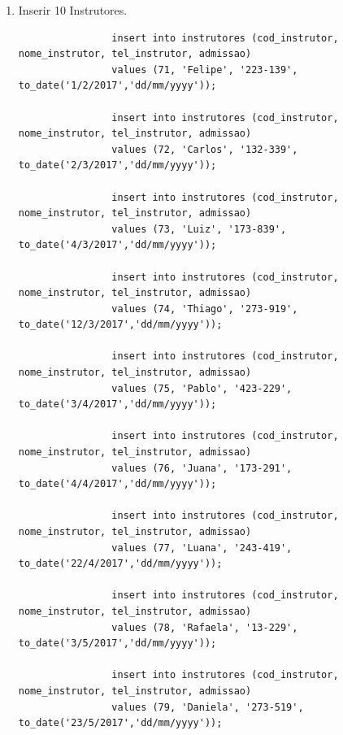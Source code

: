 \documentclass[
article,			%
11pt,				%
oneside,			%
a4paper,			%
english,			%
brazil,				%
sumario=tradicional
]{abntex2}
\begin{document}
	
	\frenchspacing 
	
	
	\maketitle
	\begin{enumerate}
		\item Inserir 10 Instrutores.
				\begin{verbatim}
				insert into instrutores (cod_instrutor, nome_instrutor, tel_instrutor, admissao) 
				values (71, 'Felipe', '223-139', to_date('1/2/2017','dd/mm/yyyy'));
				
				insert into instrutores (cod_instrutor, nome_instrutor, tel_instrutor, admissao) 
				values (72, 'Carlos', '132-339', to_date('2/3/2017','dd/mm/yyyy'));
				
				insert into instrutores (cod_instrutor, nome_instrutor, tel_instrutor, admissao) 
				values (73, 'Luiz', '173-839', to_date('4/3/2017','dd/mm/yyyy'));
				
				insert into instrutores (cod_instrutor, nome_instrutor, tel_instrutor, admissao) 
				values (74, 'Thiago', '273-919', to_date('12/3/2017','dd/mm/yyyy'));
				
				insert into instrutores (cod_instrutor, nome_instrutor, tel_instrutor, admissao) 
				values (75, 'Pablo', '423-229', to_date('3/4/2017','dd/mm/yyyy'));
				
				insert into instrutores (cod_instrutor, nome_instrutor, tel_instrutor, admissao) 
				values (76, 'Juana', '173-291', to_date('4/4/2017','dd/mm/yyyy'));
				
				insert into instrutores (cod_instrutor, nome_instrutor, tel_instrutor, admissao) 
				values (77, 'Luana', '243-419', to_date('22/4/2017','dd/mm/yyyy'));
				
				insert into instrutores (cod_instrutor, nome_instrutor, tel_instrutor, admissao) 
				values (78, 'Rafaela', '13-229', to_date('3/5/2017','dd/mm/yyyy'));
				
				insert into instrutores (cod_instrutor, nome_instrutor, tel_instrutor, admissao) 
				values (79, 'Daniela', '273-519', to_date('23/5/2017','dd/mm/yyyy'));
				

\end{verbatim}
\end{enumerate}
\end{document}
